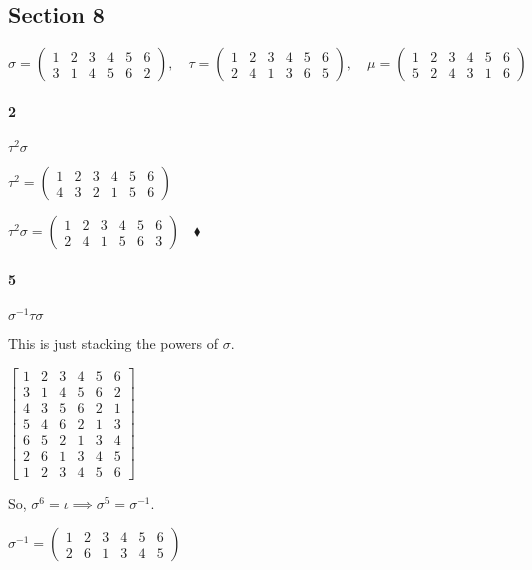 \documentclass{article}
\begin{document}
\subsection*{Section 8}

\[\sigma = \begin{pmatrix}1&2&3&4&5&6\\3&1&4&5&6&2 \end{pmatrix},\quad \tau
  = \begin{pmatrix}1&2&3&4&5&6\\ 2&4&1&3&6&5 \end{pmatrix},\quad \mu
  = \begin{pmatrix}1&2&3&4&5&6\\ 5&2&4&3&1&6 \end{pmatrix}\]


\paragraph{2} $\tau^2\sigma$


$\tau^2 = \begin{pmatrix}1&2&3&4&5&6 \\ 4&3&2&1&5&6 \end{pmatrix}$

$\tau^2\sigma = \begin{pmatrix}1&2&3&4&5&6 \\
  2&4&1&5&6&3 \end{pmatrix}\quad \blacklozenge$

\paragraph{5} $\sigma^{-1}\tau\sigma$

This is just stacking the powers of $\sigma$.

$\begin{bmatrix}
  1&2&3&4&5&6\\
  3&1&4&5&6&2\\
  4&3&5&6&2&1\\
  5&4&6&2&1&3\\
  6&5&2&1&3&4\\
  2&6&1&3&4&5\\
  1&2&3&4&5&6
\end{bmatrix}$

So, $\sigma^6 = \iota \implies \sigma^{5} = \sigma^{-1}$.

$\sigma^{-1} = \begin{pmatrix} 1&2&3&4&5&6\\2&6&1&3&4&5\end{pmatrix}$
\end{document}
